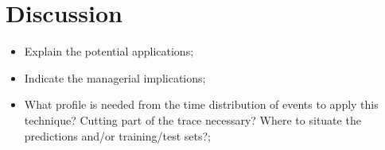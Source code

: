 \section{Discussion}\label{sec:discussion}

\begin{itemize}
    \item Explain the potential applications;
    \item Indicate the managerial implications;
    \item What profile is needed from the time distribution of events to apply this technique? Cutting part of the trace necessary? Where to situate the predictions and/or training/test sets?;
\end{itemize}